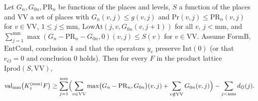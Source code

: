 \begin{lemma}\label{pf:top-shape:lowterm}
Let $G_n,G_{0n},\mathrm{PR}_n$ be functions of the places and levels, $S$ a function of the places and $\mathrm{VV}$ a set of places
with $G_n(v,j)\le g(v,j)$ and $\mathrm{Pr}(v,j)\le\mathrm{PR}_n(v,j)$ for $v\in\mathrm{VV}$, $1\le j\le\mathrm{mm}$,
$\mathrm{LowAt}(j,v,G_{0n}(v,j+1))$ for all $v$, $j<\mathrm{mm}$, and $\sum_{j=1}^{\mathrm{mm}}\max(G_n-\mathrm{PR}_n-G_{0n},0)(v,j)\le S(v)$
for $v\in\mathrm{VV}$. Assume $\mathrm{FormB}$, $\mathrm{EntCond}$, conclusion $4$ and that the operators $y_v$ preserve $\mathrm{Int}(0)$
(or that $e_O=0$ and conclusion $0$ holds). Then for every $F$ in the product lattice $\mathrm{Iprod}(S,\mathrm{VV})$,
\[
\mathrm{val}_{\mathrm{mm}}\bigl(K_z^{(\mathrm{mm})}F\bigr)\ge\sum_{j=1}^{\mathrm{mm}}\Bigl(\sum_{v\in\mathrm{VV}}\max\bigl(G_n-\mathrm{PR}_n,G_{0n}\bigr)(v,j)
+\sum_{v\notin\mathrm{VV}}G_{0n}(v,j)\Bigr)-\sum_{j<\mathrm{mm}}d_G(j).
\]
\end{lemma}

